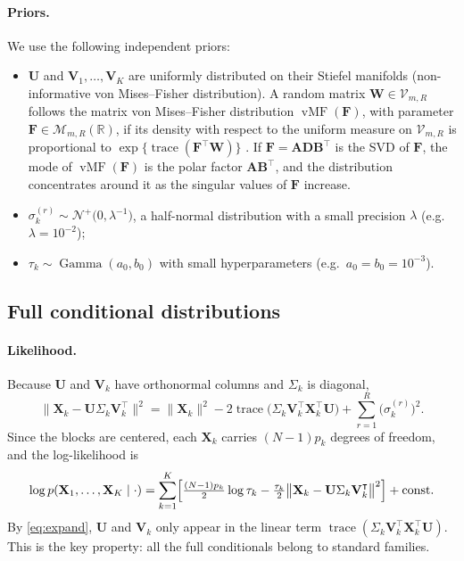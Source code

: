 \documentclass[11pt]{article}
\DeclareMathOperator{\trace}{\mathrm{trace}}
\DeclareMathOperator{\vMF}{vMF}
\DeclareMathOperator{\Ga}{Gamma}
\newcommand{\X}{\mathbf{X}}
\newcommand{\U}{\mathbf{U}}
\newcommand{\V}{\mathbf{V}}
\newcommand{\F}{\mathbf{F}}
\newcommand{\W}{\mathbf{W}}
\newcommand{\Stiefel}[2]{\mathcal V_{#1,#2}}
\begin{document}
\paragraph{Priors.} We use the following independent priors:
\begin{itemize}
  \item $\U$ and $\V_1,\ldots,\V_K$ are uniformly distributed on their Stiefel manifolds (non-informative von Mises--Fisher distribution). A random matrix $\W\in\Stiefel{m}{R}$ follows the matrix von Mises--Fisher distribution $\vMF(\F)$, with parameter $\F\in\mathcal M_{m,R}(\mathbb R)$, if its density with
respect to the uniform measure on $\Stiefel{m}{R}$ is proportional to $\exp\{\trace(\F^\intercal\W)\}$
\cite{hoff2009}. If $\F=\mathbf A\mathbf D\mathbf B^\intercal$ is the SVD of $\F$, the mode of $\vMF(\F)$ is the
polar factor $\mathbf A\mathbf B^\intercal$, and the distribution concentrates around it as the singular values of $\F$ increase.
  \item $\sigma_k^{(r)}\sim\mathcal N^+\bigl(0,\lambda^{-1}\bigr)$, a half-normal distribution with a small precision
        $\lambda$ (e.g.\ $\lambda=10^{-2}$); 
  \item $\tau_k\sim\Ga(a_0,b_0)$ with small hyperparameters (e.g.\ $a_0=b_0=10^{-3}$).
\end{itemize}

\subsection{Full conditional distributions}

\paragraph{Likelihood.} Because $\U$ and $\V_k$ have orthonormal columns and $\Sigma_k$ is diagonal,
\begin{equation}
  \bigl\|\X_k-\U\Sigma_k\V_k^\intercal\bigr\|^2
  =\|\X_k\|^2-2\trace\bigl(\Sigma_k\V_k^\intercal\X_k^\intercal\U\bigr)+\sum_{r=1}^R\bigl(\sigma_k^{(r)}\bigr)^2 .
  \label{eq:expand}
\end{equation}
Since the blocks are centered, each $\X_k$ carries $(N-1)p_k$ degrees of freedom, and the log-likelihood is
\[
  \log p(\X_1,\ldots,\X_K\mid\cdot)=\sum_{k=1}^K\Bigl[\tfrac{(N-1)p_k}{2}\log\tau_k
  -\tfrac{\tau_k}{2}\bigl\|\X_k-\U\Sigma_k\V_k^\intercal\bigr\|^2\Bigr]+\text{const}.
\]
By \eqref{eq:expand}, $\U$ and $\V_k$ only appear in the linear term $\trace(\Sigma_k\V_k^\intercal\X_k^\intercal\U)$.
This is the key property: all the full conditionals belong to standard families.
\end{document}
